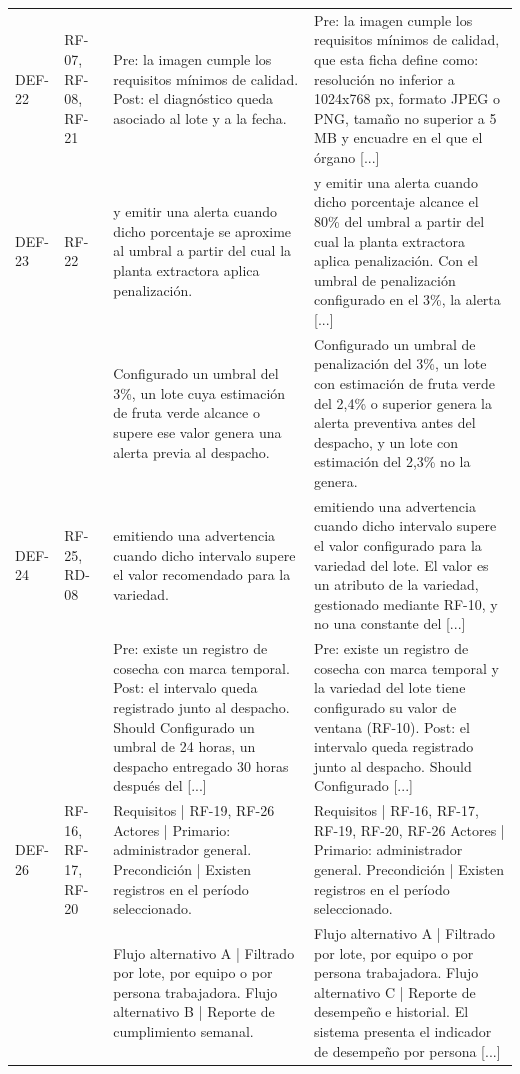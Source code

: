 \documentclass[11pt,letterpaper]{article}
\begin{document}
{\begin{longtable}{p{1.35cm} p{2.1cm} p{5.4cm} p{5.4cm}}
DEF-22 & RF-07, RF-08, RF-21 & Pre: la imagen cumple los requisitos mínimos de calidad. Post: el diagnóstico queda asociado al lote y a la fecha. & Pre: la imagen cumple los requisitos mínimos de calidad, que esta ficha define como: resolución no inferior a 1024x768 px, formato JPEG o PNG, tamaño no superior a 5 MB y encuadre en el que el órgano [...]\\
DEF-23 & RF-22 & y emitir una alerta cuando dicho porcentaje se aproxime al umbral a partir del cual la planta extractora aplica penalización. & y emitir una alerta cuando dicho porcentaje alcance el 80\% del umbral a partir del cual la planta extractora aplica penalización. Con el umbral de penalización configurado en el 3\%, la alerta [...]\\
 &  & Configurado un umbral del 3\%, un lote cuya estimación de fruta verde alcance o supere ese valor genera una alerta previa al despacho. & Configurado un umbral de penalización del 3\%, un lote con estimación de fruta verde del 2,4\% o superior genera la alerta preventiva antes del despacho, y un lote con estimación del 2,3\% no la genera.\\
DEF-24 & RF-25, RD-08 & emitiendo una advertencia cuando dicho intervalo supere el valor recomendado para la variedad. & emitiendo una advertencia cuando dicho intervalo supere el valor configurado para la variedad del lote. El valor es un atributo de la variedad, gestionado mediante RF-10, y no una constante del [...]\\
 &  & Pre: existe un registro de cosecha con marca temporal. Post: el intervalo queda registrado junto al despacho. Should Configurado un umbral de 24 horas, un despacho entregado 30 horas después del [...] & Pre: existe un registro de cosecha con marca temporal y la variedad del lote tiene configurado su valor de ventana (RF-10). Post: el intervalo queda registrado junto al despacho. Should Configurado [...]\\
DEF-26 & RF-16, RF-17, RF-20 & Requisitos | RF-19, RF-26 Actores | Primario: administrador general. Precondición | Existen registros en el período seleccionado. & Requisitos | RF-16, RF-17, RF-19, RF-20, RF-26 Actores | Primario: administrador general. Precondición | Existen registros en el período seleccionado.\\
 &  & Flujo alternativo A | Filtrado por lote, por equipo o por persona trabajadora. Flujo alternativo B | Reporte de cumplimiento semanal. & Flujo alternativo A | Filtrado por lote, por equipo o por persona trabajadora. Flujo alternativo C | Reporte de desempeño e historial. El sistema presenta el indicador de desempeño por persona [...]\\

\end{longtable}}
\end{document}
